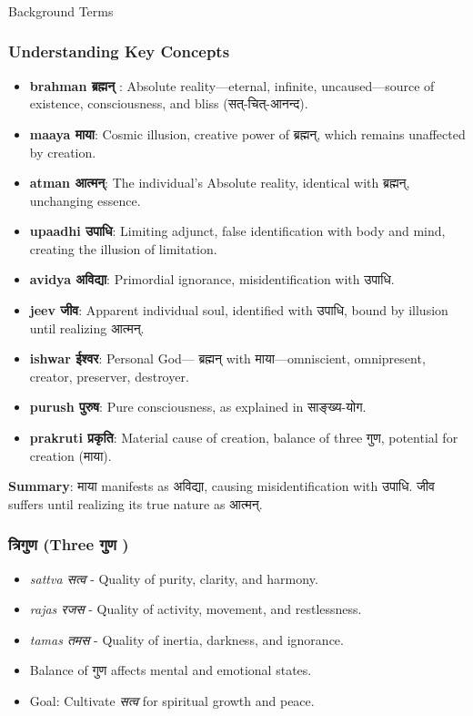 \begin{frame}[fragile]\frametitle{}
\begin{center}
{\Large Background Terms}
\end{center}
\end{frame}

\begin{frame}[fragile]\frametitle{Understanding Key Concepts}
      \begin{itemize}
        \item \textbf{brahman ब्रह्मन् }: Absolute reality—eternal, infinite, uncaused—source of existence, consciousness, and bliss (सत्-चित्-आनन्द).
        \item \textbf{maaya माया}: Cosmic illusion, creative power of ब्रह्मन्, which remains unaffected by creation.
        \item \textbf{atman आत्मन्}: The individual’s Absolute reality, identical with ब्रह्मन्, unchanging essence.
        \item \textbf{upaadhi उपाधि}: Limiting adjunct, false identification with body and mind, creating the illusion of limitation.
        \item \textbf{avidya अविद्या}: Primordial ignorance, misidentification with उपाधि.
        \item \textbf{jeev जीव}: Apparent individual soul, identified with उपाधि, bound by illusion until realizing आत्मन्.
        \item \textbf{ishwar ईश्वर}: Personal God— ब्रह्मन् with माया—omniscient, omnipresent, creator, preserver, destroyer.
        \item \textbf{purush पुरुष}: Pure consciousness, as explained in साङ्ख्य-योग.
        \item \textbf{prakruti प्रकृति}: Material cause of creation, balance of three गुण, potential for creation (माया).
      \end{itemize}

\textbf{Summary}: माया manifests as अविद्या, causing misidentification with उपाधि. जीव suffers until realizing its true nature as आत्मन्.
\end{frame}

\begin{frame}[fragile]\frametitle{त्रिगुण  (Three गुण )}

      \begin{itemize}
		\item \textit{sattva सत्व } - Quality of purity, clarity, and harmony.
		\item \textit{rajas रजस } - Quality of activity, movement, and restlessness.
		\item \textit{tamas तमस } - Quality of inertia, darkness, and ignorance.
		\item Balance of गुण  affects mental and emotional states.
		\item Goal: Cultivate \textit{सत्व} for spiritual growth and peace.
	  \end{itemize}

\end{frame}

